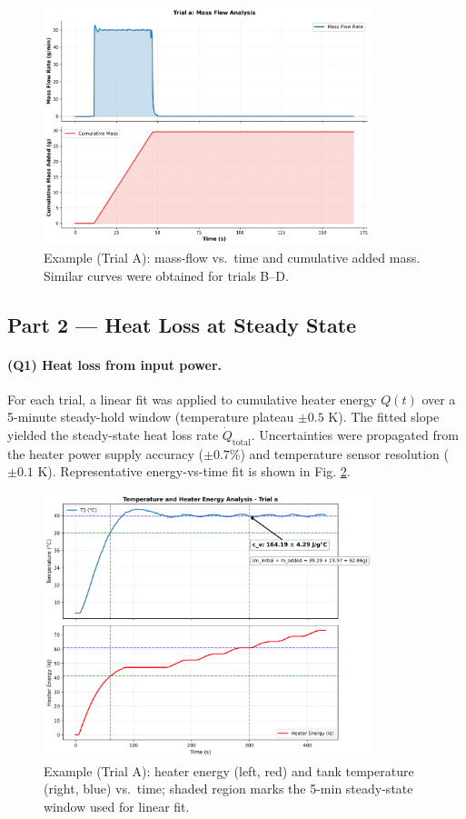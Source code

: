 \documentclass[12pt]{article}
\begin{document}
\begin{figure}[H]
\centering
\includegraphics[width=0.85\textwidth]{graphs/part1_trial_a_mass_flow.png}
\caption{Example (Trial A): mass-flow vs.\ time and cumulative added mass. Similar curves were obtained for trials B--D.}
\label{fig:part1_massflow}
\end{figure}

\subsection*{Part 2 — Heat Loss at Steady State}
\paragraph{(Q1) Heat loss from input power.} For each trial, a linear fit was applied to cumulative heater energy $Q(t)$ over a 5-minute steady-hold window (temperature plateau $\pm 0.5$ K). The fitted slope yielded the steady-state heat loss rate $\dot{Q}_{\text{total}}$. Uncertainties were propagated from the heater power supply accuracy ($\pm 0.7$\%) and temperature sensor resolution ($\pm 0.1$ K). Representative energy-vs-time fit is shown in Fig. \ref{fig:part2_energyfit}.

\begin{figure}[H]
\centering
\includegraphics[width=0.85\textwidth]{graphs/part2_trial_a_temp_heater_energy.png}
\caption{Example (Trial A): heater energy (left, red) and tank temperature (right, blue) vs.\ time; shaded region marks the 5-min steady-state window used for linear fit.}
\label{fig:part2_energyfit}
\end{figure}
\end{document}
